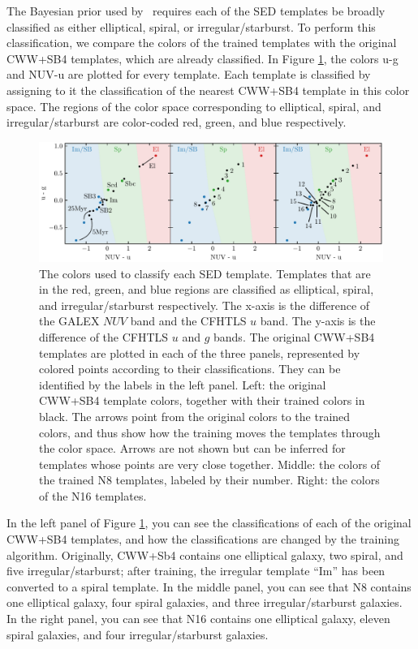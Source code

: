 The Bayesian prior used by \bpz\ requires each of the SED templates be broadly classified as either elliptical, spiral, or irregular/starburst. 
To perform this classification, we compare the colors of the trained templates with the original CWW+SB4 templates, which are already classified. 
In Figure \ref{fig:color_classify}, the colors u-g and NUV-u are plotted for every template. 
Each template is classified by assigning to it the classification of the nearest CWW+SB4 template in this color space. 
The regions of the color space corresponding to elliptical, spiral, and irregular/starburst are color-coded red, green, and blue respectively. 

\begin{figure}
    \centering
    \includegraphics{figures/color_classify.pdf}
    \caption{The colors used to classify each SED template. Templates that are in the red, green, and blue regions are classified as elliptical, spiral, and irregular/starburst respectively. The x-axis is the difference of the GALEX $NUV$ band and the CFHTLS $u$ band. The y-axis is the difference of the CFHTLS $u$ and $g$ bands. The original CWW+SB4 templates are plotted in each of the three panels, represented by colored points according to their classifications. They can be identified by the labels in the left panel. Left: the original CWW+SB4 template colors, together with their trained colors in black. The arrows point from the original colors to the trained colors, and thus show how the training moves the templates through the color space. Arrows are not shown but can be inferred for templates whose points are very close together. Middle: the colors of the trained N8 templates, labeled by their number. Right: the colors of the N16 templates.}
    \label{fig:color_classify}
\end{figure}

In the left panel of Figure \ref{fig:color_classify}, you can see the classifications of each of the original CWW+SB4 templates, and how the classifications are changed by the training algorithm.
Originally, CWW+Sb4 contains one elliptical galaxy, two spiral, and five irregular/starburst; after training, the irregular template ``Im'' has been converted to a spiral template. 
In the middle panel, you can see that N8 contains one elliptical galaxy, four spiral galaxies, and three irregular/starburst galaxies. 
In the right panel, you can see that N16 contains one elliptical galaxy, eleven spiral galaxies, and four irregular/starburst galaxies. 




